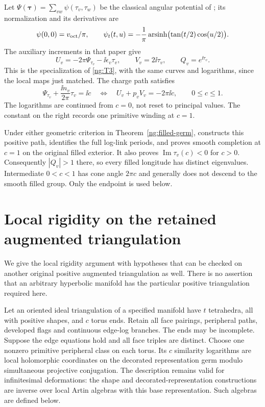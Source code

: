 Let $\Psi(\boldsymbol\tau)=\sum_{vw}\psi(\tau_v,\tau_w)$ be the
classical angular potential of \cite[equation~(1.3)]{Circle};
its normalization and its derivatives are
\[
 \psi(0,0)=v_{\rm oct}/\pi,\qquad
 \psi_t(t,u)=-\frac1\pi
       \operatorname{arsinh}\bigl(\tan(t/2)\cos(u/2)\bigr).
\]
The auxiliary increments in that paper give
\begin{equation}\label{ng:anchor-logs}
 U_v=-2\pi\Psi_{\tau_v}-\ii\epsilon_v\tau_v,\qquad
 V_v=2\ii\tau_v,\qquad Q_v=e^{\ii\tau_v}.
\end{equation}
This is the specialization of \eqref{ng:T3}, with the same
curves and logarithms, since the local maps just matched.
The charge path satisfies
\begin{equation}\label{ng:charge-path}
 \Psi_{\tau_v}+\frac{\ii n_v}{2\pi}\tau_v=\ii c
 \quad\Longleftrightarrow\quad
 U_v+p_vV_v=-2\pi\ii c,\qquad 0\le c\le1.
\end{equation}
The logarithms are continued from $c=0$, not reset to principal
values. The constant on the right records one primitive winding
at $c=1$.

Under either geometric criterion in Theorem~\ref{ng:filled-germ},
\cite[Theorems~1.1 and~7.1]{Circle} constructs this positive
path, identifies the full log-link periods, and proves smooth
completion at $c=1$ on the original filled exterior.
It also proves $\operatorname{Im}\tau_v(c)<0$ for $c>0$.
Consequently $|Q_v|>1$ there, so every filled longitude has
distinct eigenvalues. Intermediate $0<c<1$ has cone angle
$2\pi c$ and generally does not descend to the smooth filled group.
Only the endpoint is used below.

\section{Local rigidity on the retained augmented triangulation}
\label{ng:rigidity}

We give the local rigidity argument with hypotheses that can be checked
on another original positive augmented triangulation as well.
There is no assertion that an arbitrary hyperbolic manifold has the
particular positive triangulation required here.

\begin{proposition}\label{ng:positive-germ}
Let an oriented ideal triangulation of a specified manifold have $t$
tetrahedra, all with positive shapes, and $c$ torus ends. Retain all
face pairings, peripheral paths, developed flags and continuous
edge-log branches. The ends may be incomplete. Suppose the edge
equations hold and all face triples are distinct.
Choose one nonzero primitive peripheral class on each torus.
Its $c$ similarity logarithms are local holomorphic coordinates on
the decorated representation germ modulo simultaneous projective
conjugation. The description remains valid for infinitesimal deformations: the
shape and decorated-representation constructions are inverse over
local Artin algebras with this base representation. Such algebras
are defined below.
\end{proposition}

